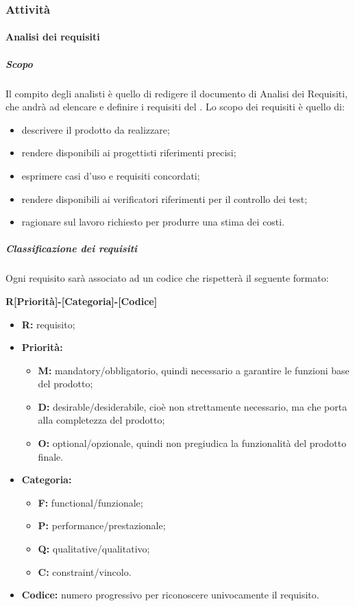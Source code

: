 \documentclass[]{article}
\begin{document}
				\subsubsection{Attività}
					\paragraph{Analisi dei requisiti} %
						\subparagraph{Scopo} %
						Il compito degli analisti è quello di redigere il documento di Analisi dei Requisiti, che andrà ad elencare e definire i requisiti del . Lo scopo dei requisiti è quello di:
						\begin{itemize}
							\item descrivere il prodotto da realizzare;
							\item rendere disponibili ai progettisti riferimenti precisi;
							\item esprimere casi d'uso e requisiti concordati;
							\item rendere disponibili ai verificatori riferimenti per il controllo dei test;
							\item ragionare sul lavoro richiesto per produrre una stima dei costi.
						\end{itemize}
						\subparagraph{Classificazione dei requisiti} %
						Ogni requisito sarà associato ad un codice che rispetterà il seguente formato:
						\begin{center}
							\textbf{R[Priorità]-[Categoria]-[Codice]}
						\end{center}
						\begin{itemize}
							\item \textbf{R:} requisito;
							\item \textbf{Priorità:}
								\begin{itemize}
									\item \textbf{M:} mandatory/obbligatorio, quindi necessario a garantire le funzioni base del prodotto;
									\item \textbf{D:} desirable/desiderabile, cioè non strettamente necessario, ma che porta alla completezza del prodotto;
									\item \textbf{O:} optional/opzionale, quindi non pregiudica la funzionalità del prodotto finale.
								\end{itemize}
							\item \textbf{Categoria:}
								\begin{itemize}
									\item \textbf{F:} functional/funzionale;
									\item \textbf{P:} performance/prestazionale;
									\item \textbf{Q:} qualitative/qualitativo;
									\item \textbf{C:} constraint/vincolo.
								\end{itemize}
							\item \textbf{Codice:} numero progressivo per riconoscere univocamente il requisito.
						\end{itemize}
\end{document}
